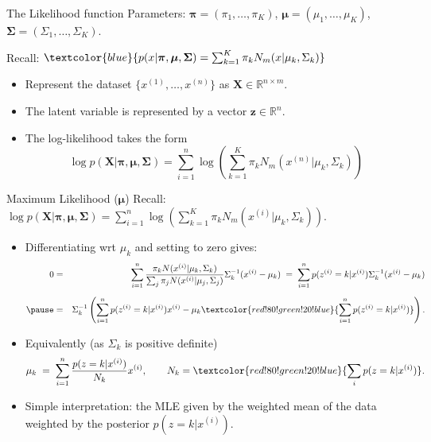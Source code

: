 \documentclass[11pt,handout,aspectratio=169]{beamer}
\begin{document}
\begin{frame}{The Likelihood function}
Parameters: $\boldsymbol\pi=(\pi_1,\ldots,\pi_K)$, $\boldsymbol\mu=(\mu_1,\ldots,\mu_K)$, $\boldsymbol\Sigma=(\Sigma_1,\ldots,\Sigma_K)$.

Recall: $\textcolor{blue}{p(x|\boldsymbol\pi,\boldsymbol\mu,\boldsymbol\Sigma)=\sum_{k=1}^K \pi_k N_m(x|\mu_k,\Sigma_k)}$
\medskip

\begin{itemize}
	\item Represent the dataset $\{x^{(1)},\ldots,x^{(n)}\}$ as $\boldsymbol X\in \mathbb R^{n\times m}$.
	\item The latent variable is represented by a vector $\boldsymbol z\in \mathbb R^n$.
	\item The log-likelihood takes the form $$\log p(\boldsymbol X|\boldsymbol\pi,\boldsymbol\mu,\boldsymbol\Sigma)=\sum_{i=1}^n\log\left(\sum_{k=1}^K\pi_k N_m(x^{(n)}|\mu_k,\Sigma_k)\right)$$
\end{itemize}
\end{frame}

\begin{frame}{Maximum Likelihood ($\boldsymbol \mu$)}
Recall: $\log p(\boldsymbol X|\boldsymbol\pi,\boldsymbol\mu,\boldsymbol\Sigma)=\sum_{i=1}^n\log\left(\sum_{k=1}^K\pi_k N_m(x^{(i)}|\mu_k,\Sigma_k)\right)$.
\begin{itemize}
	\item Differentiating wrt $\mu_k$ and setting to zero gives:
	\begin{eqnarray*}
		0&=&\sum_{i=1}^n\frac{\pi_k N(x^{(i)}|\mu_k,\Sigma_k)}{\sum_j \pi_j N(x^{(i)}|\mu_j,\Sigma_j)}\Sigma_k^{-1}(x^{(i)}-\mu_k)\;=\; \sum_{i=1}^n p(z^{(i)}=k|x^{(i)})\Sigma_k^{-1}(x^{(i)}-\mu_k)\\[2mm]\pause
		&=&\Sigma_k^{-1}\left(\sum_{i=1}^n p(z^{(i)}=k|x^{(i)})x^{(i)}-\mu_k\textcolor{red!80!green!20!blue}{\sum_{i=1}^n p(z^{(i)}=k|x^{(i)})}\right).
	\end{eqnarray*} 	
	\item Equivalently (as $\Sigma_k$ is positive definite) $$\mu_k\;=\;\sum_{i=1}^n \frac{p(z=k|x^{(i)})}{N_k}x^{(i)},\qquad N_k=\textcolor{red!80!green!20!blue}{\sum_i p(z=k|x^{(i)})}.$$
	\item Simple interpretation: the MLE given by the weighted mean of the data weighted by the posterior $p(z=k|x^{(i)})$.
\end{itemize}
\end{frame}
\end{document}
